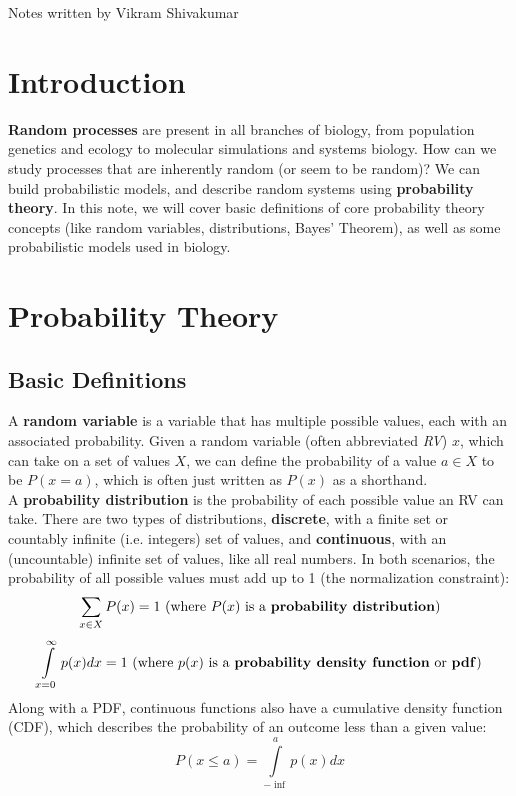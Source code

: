 \documentclass[12pt]{article}
\begin{document}
\thispagestyle{plain}
   \newpage
   \setcounter{page}{1}
   \noindent
   \begin{center}
   \end{center}
   {Notes written by Vikram Shivakumar}
   \vspace*{4mm}


\section{Introduction}
\textbf{Random processes} are present in all branches of biology, from population genetics and ecology to molecular simulations and systems biology. How can we study processes that are inherently random (or seem to be random)? We can build probabilistic models, and describe random systems using \textbf{probability theory}. In this note, we will cover basic definitions of core probability theory concepts (like random variables, distributions, Bayes' Theorem), as well as some probabilistic models used in biology.

\section{Probability Theory}
\subsection{Basic Definitions}
A \textbf{random variable} is a variable that has multiple possible values, each with an associated probability. Given a random variable (often abbreviated \textit{RV}) $x$, which can take on a set of values $X$, we can define the probability of a value $a \in X$ to be $P(x = a)$, which is often just written as $P(x)$ as a shorthand.\\[10pt]
A \textbf{probability distribution} is the probability of each possible value an RV can take. There are two types of distributions, \textbf{discrete}, with a finite set or countably infinite (i.e. integers) set of values, and \textbf{continuous}, with an (uncountable) infinite set of values, like all real numbers. In both scenarios, the probability of all possible values must add up to 1 (the normalization constraint):
$$\sum\limits_{x\in X}P(x) = 1\text{ (where }P(x)\text{ is a \textbf{probability distribution})}$$
$$\int\limits_{x=0}^{\infty}p(x)dx = 1\text{ (where }p(x)\text{ is a \textbf{probability density function} or \textbf{pdf})}$$
Along with a PDF, continuous functions also have a cumulative density function (CDF), which describes the probability of an outcome less than a given value:
$$P(x\leq a) = \int\limits_{-\inf}^ap(x)dx
$$
\end{document}
